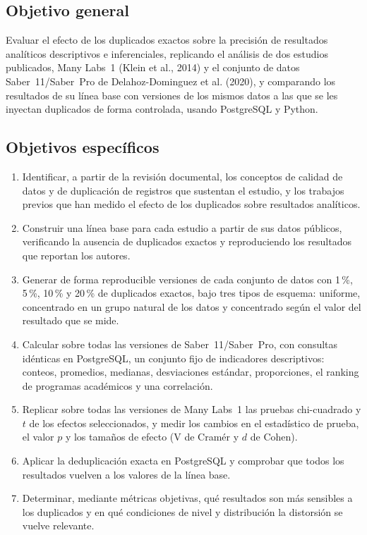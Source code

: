 \documentclass[11pt,openany,oneside,letterpaper]{book}
\begin{document}
\subsection{Objetivo general}

Evaluar el efecto de los duplicados exactos sobre la precisión de resultados analíticos descriptivos e inferenciales, replicando el análisis de dos estudios publicados, Many Labs~1 (Klein et al., 2014) y el conjunto de datos Saber~11/Saber~Pro de Delahoz-Dominguez et al. (2020), y comparando los resultados de su línea base con versiones de los mismos datos a las que se les inyectan duplicados de forma controlada, usando PostgreSQL y Python.

\subsection{Objetivos específicos}

\begin{enumerate}
 \item Identificar, a partir de la revisión documental, los conceptos de calidad de datos y de duplicación de registros que sustentan el estudio, y los trabajos previos que han medido el efecto de los duplicados sobre resultados analíticos.
 \item Construir una línea base para cada estudio a partir de sus datos públicos, verificando la ausencia de duplicados exactos y reproduciendo los resultados que reportan los autores.
 \item Generar de forma reproducible versiones de cada conjunto de datos con 1\,\%, 5\,\%, 10\,\% y 20\,\% de duplicados exactos, bajo tres tipos de esquema: uniforme, concentrado en un grupo natural de los datos y concentrado según el valor del resultado que se mide.
 \item Calcular sobre todas las versiones de Saber~11/Saber~Pro, con consultas idénticas en PostgreSQL, un conjunto fijo de indicadores descriptivos: conteos, promedios, medianas, desviaciones estándar, proporciones, el ranking de programas académicos y una correlación.
 \item Replicar sobre todas las versiones de Many Labs~1 las pruebas chi-cuadrado y $t$ de los efectos seleccionados, y medir los cambios en el estadístico de prueba, el valor $p$ y los tamaños de efecto (V de Cramér y $d$ de Cohen).
 \item Aplicar la deduplicación exacta en PostgreSQL y comprobar que todos los resultados vuelven a los valores de la línea base.
 \item Determinar, mediante métricas objetivas, qué resultados son más sensibles a los duplicados y en qué condiciones de nivel y distribución la distorsión se vuelve relevante.
\end{enumerate}
\end{document}

